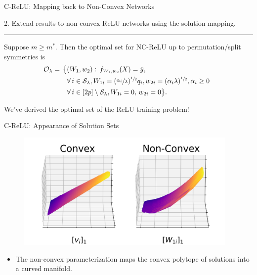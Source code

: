 \documentclass[usenames,dvipsnames,mathserif,notheorems]{beamer}
\newcommand{\horizontalrule}{
	{
			\vspace{-0.5em}
			\center \rule{\textwidth}{0.1em}
			\vspace{-0.2em}
		}
}
\newcommand{\bad}[1]{\textcolor{bad}{#1}}
\newcommand{\good}[1]{\textcolor{good}{#1}}
\begin{document}
\begin{frame}{C-ReLU: Mapping back to Non-Convex Networks}

	{\raggedright
		\large
		2. Extend results to \bad{non-convex} ReLU networks
		using the solution mapping.
		\vspace{1ex}
		\pause
	}

	\horizontalrule

	\begin{theorem}[Informal]
		Suppose \( m \geq m^* \).
		Then the optimal set for NC-ReLU up to
		\bad{permutation/split symmetries} is
		\vspace{-1ex}
		\begin{equation*}
			\begin{aligned}
				\hspace{-0.5em} \mathcal{O}_\lambda  = \,
				\big\{
				 & (W_1,  w_2) :
				\, f_{W_1, w_2}(X)  =  \hat y,                       \\
				 & \forall \, {i}  \in  \mathcal{S}_\lambda,
				W_{1i} = (\sfrac{\alpha_{i}}{\lambda})^{\sfrac{1}{2}} q_i,
				w_{2i} = (\alpha_i \lambda)^{\sfrac{1}{2}},
				\alpha_i \geq 0                                      \\
				 & \forall \, {i}  \in [2p] \setminus \mathcal{S}_\lambda,
				W_{1i} = 0, \, w_{2i} = 0
				\big\}.
			\end{aligned}
		\end{equation*}
	\end{theorem}

	\pause

	We've derived the \good{optimal set} of the ReLU training problem!

\end{frame}

\begin{frame}{C-ReLU: Appearance of Solution Sets}
	\begin{figure}[]
		\centering
		\includegraphics[width=0.96\textwidth]{assets/solution_sets_vis_270.png}
	\end{figure}

	\begin{itemize}
		\item The non-convex parameterization maps the \good{convex polytope} of
		      solutions into a \bad{curved manifold}.
	\end{itemize}


\end{frame}
\end{document}
